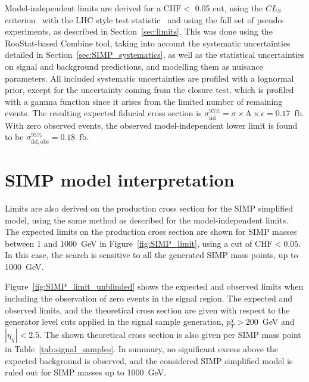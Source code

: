 Model-independent limits are derived for a $\mathrm{CHF} <$ 0.05 cut, using the $CL_S$ criterion~\cite{CLS1,CLS2} with the LHC style test statistic~\cite{ATLAS:2011tau} and using the full set of pseudo-experiments, as described in Section~\ref{sec:limits}. This was done using the RooStat-based Combine tool, taking into account the systematic uncertainties detailed in Section~\ref{sec:SIMP_systematics}, as well as the statistical uncertainties on signal and background predictions, and modelling them as nuisance parameters. All included systematic uncertainties are profiled with a lognormal prior, except for the uncertainty coming from the closure test, which is profiled with a gamma function since it arises from the limited number of remaining events. The resulting expected fiducial cross section is $\sigma_{\mathrm{fid}}^{95\%} = \sigma\times\mathrm{A}\times\epsilon = 0.17$~fb. With zero observed events, the observed model-independent lower limit is found to be $\sigma_{\mathrm{fid, obs}}^{95\%} = 0.18$~fb.

\section{SIMP model interpretation}
\label{sec:SIMP_interpretation}

Limits are also derived on the production cross section for the \ac{SIMP} simplified model, using the same method as described for the model-independent limits.  The expected limits on the production cross section are shown for \ac{SIMP} masses between 1 and 1000~GeV in Figure~\ref{fig:SIMP_limit}, using a cut of $\mathrm{CHF} < 0.05$. In this case, the search is sensitive to all the generated \ac{SIMP} mass points, up to 1000~GeV.

Figure~\ref{fig:SIMP_limit_unblinded} shows the expected and observed limits when including the observation of zero events in the signal region. The expected and observed limits, and the theoretical cross section are given with respect to the generator level cuts applied in the signal sample generation, $p_T^{\chi} > 200$~GeV and $|\eta_{\chi}| < 2.5$. The shown theoretical cross section is also given per \ac{SIMP} mass point in Table~\ref{tab:signal_samples}. In summary, no significant excess above the expected background is observed, and the considered \ac{SIMP} simplified model is ruled out for \ac{SIMP} masses up to 1000~GeV.


